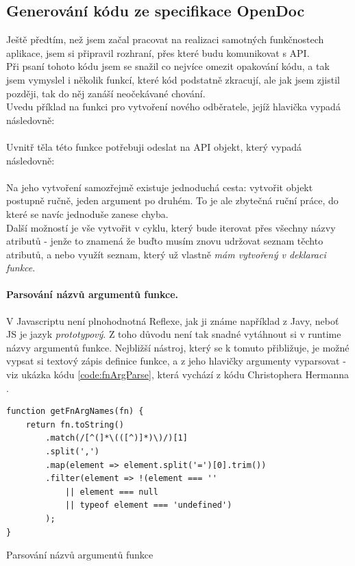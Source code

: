 
\subsection{Generování kódu ze specifikace OpenDoc}\label{implementation:codegen}

Ještě předtím, než jsem začal pracovat na realizaci samotných funkčnostech aplikace, jsem si připravil rozhraní, přes které budu komunikovat s API.\\
Při psaní tohoto kódu jsem se snažil co nejvíce omezit opakování kódu, a tak jsem vymyslel i několik funkcí, které kód podstatně zkracují, ale jak jsem zjistil později, tak do něj zanáší neočekávané chování.\\
Uvedu příklad na funkci pro vytvoření nového odběratele, jejíž hlavička vypadá následovně:\\
\\
Uvnitř těla této funkce potřebuji odeslat na API objekt, který vypadá následovně:\\
\\
Na jeho vytvoření samozřejmě existuje jednoduchá cesta: vytvořit objekt postupně ručně, jeden argument po druhém. To je ale zbytečná ruční práce, do které se navíc jednoduše zanese chyba.\\
Další možností je vše vytvořit v cyklu, který bude iterovat přes všechny názvy atributů - jenže to znamená že buďto musím znovu udržovat seznam těchto atributů, a nebo využít seznam, který už vlastně \emph{mám vytvořený v deklaraci funkce}.\\

\paragraph{Parsování názvů argumentů funkce.} V Javascriptu není plnohodnotná Reflexe, jak ji známe například z Javy, neboť JS je jazyk \emph{prototypový}. Z toho důvodu není tak snadné vytáhnout si v runtime názvy argumentů funkce. Nejbližší nástroj, který se k tomuto přibližuje, je možné vypsat si textový zápis definice funkce, a z jeho hlavičky argumenty vyparsovat - viz ukázka kódu \ref{code:fnArgParse}, která vychází z kódu Christophera Hermanna \cite{fn-parse}.

\begin{listing}[h]
\begin{verbatim}
function getFnArgNames(fn) {
    return fn.toString()
        .match(/[^(]*\(([^)]*)\)/)[1]
        .split(',')
        .map(element => element.split('=')[0].trim())
        .filter(element => !(element === '' 
            || element === null 
            || typeof element === 'undefined')
        );
}
\end{verbatim}
\caption{Parsování názvů argumentů funkce} \label{code:fnArgParse}
\end{listing}

